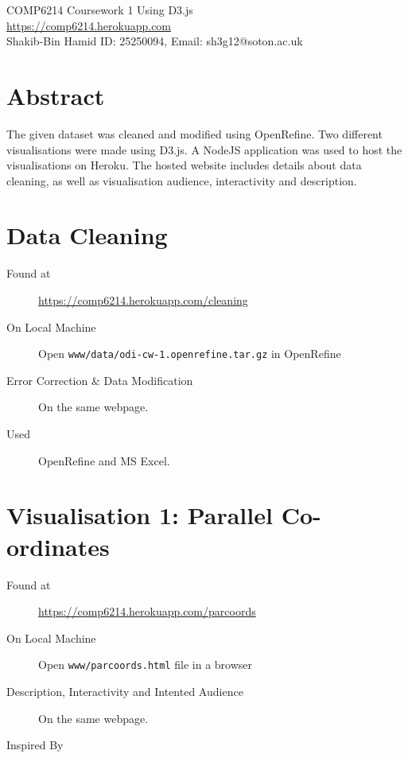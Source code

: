 \documentclass[10pt]{article}
\begin{document}
\begin{center}
\Large{
COMP6214 Coursework 1 Using D3.js\\
\url{https://comp6214.herokuapp.com}
}
\\

Shakib-Bin Hamid ID: 25250094, Email: sh3g12@soton.ac.uk

\end{center}

\section*{Abstract}

The given dataset was cleaned and modified using OpenRefine. Two different visualisations were made using D3.js. A NodeJS application was used to host the visualisations on Heroku. The hosted website includes details about data cleaning, as well as visualisation audience, interactivity and description.

\section{Data Cleaning}

\begin{description}
\item[Found at ] \url{https://comp6214.herokuapp.com/cleaning}
\item[On Local Machine] Open \texttt{www/data/odi-cw-1.openrefine.tar.gz} in OpenRefine
\item[Error Correction \& Data Modification] On the same webpage.
\item[Used] OpenRefine\cite{openrefineteam} and MS Excel.
\end{description}

\section{Visualisation 1: Parallel Co-ordinates}

\begin{description}
\item[Found at ] \url{https://comp6214.herokuapp.com/parcoords}
\item[On Local Machine] Open \texttt{www/parcoords.html} file in a browser
\item[Description, Interactivity and Intented Audience] On the same webpage.
\item[Inspired By] \cite{kaichang}
\end{description}
\end{document}
